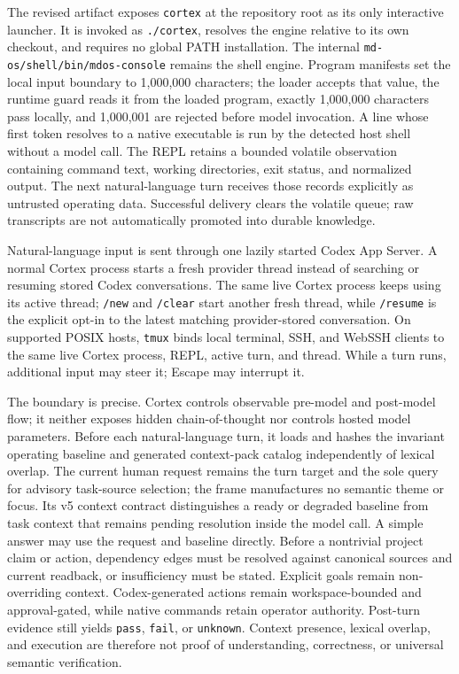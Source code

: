 \documentclass[10pt,twocolumn]{article}
\theoremstyle{definition}
\theoremstyle{plain}
\theoremstyle{remark}
\newcommand{\file}[1]{\nolinkurl{#1}}
\begin{document}
The revised artifact exposes \file{cortex} at the repository root as its only interactive launcher.  It is invoked as \file{./cortex}, resolves the engine relative to its own checkout, and requires no global PATH installation.  The internal \file{md-os/shell/bin/mdos-console} remains the shell engine.  Program manifests set the local input boundary to 1,000,000 characters; the loader accepts that value, the runtime guard reads it from the loaded program, exactly 1,000,000 characters pass locally, and 1,000,001 are rejected before model invocation.  A line whose first token resolves to a native executable is run by the detected host shell without a model call.  The REPL retains a bounded volatile observation containing command text, working directories, exit status, and normalized output.  The next natural-language turn receives those records explicitly as untrusted operating data.  Successful delivery clears the volatile queue; raw transcripts are not automatically promoted into durable knowledge.

Natural-language input is sent through one lazily started Codex App Server.  A normal Cortex process starts a fresh provider thread instead of searching or resuming stored Codex conversations.  The same live Cortex process keeps using its active thread; \file{/new} and \file{/clear} start another fresh thread, while \file{/resume} is the explicit opt-in to the latest matching provider-stored conversation.  On supported POSIX hosts, \file{tmux} binds local terminal, SSH, and WebSSH clients to the same live Cortex process, REPL, active turn, and thread.  While a turn runs, additional input may steer it; Escape may interrupt it.

The boundary is precise. Cortex controls observable pre-model and post-model flow; it neither exposes hidden chain-of-thought nor controls hosted model parameters. Before each natural-language turn, it loads and hashes the invariant operating baseline and generated context-pack catalog independently of lexical overlap. The current human request remains the turn target and the sole query for advisory task-source selection; the frame manufactures no semantic theme or focus. Its v5 context contract distinguishes a ready or degraded baseline from task context that remains pending resolution inside the model call. A simple answer may use the request and baseline directly. Before a nontrivial project claim or action, dependency edges must be resolved against canonical sources and current readback, or insufficiency must be stated. Explicit goals remain non-overriding context. Codex-generated actions remain workspace-bounded and approval-gated, while native commands retain operator authority. Post-turn evidence still yields \file{pass}, \file{fail}, or \file{unknown}. Context presence, lexical overlap, and execution are therefore not proof of understanding, correctness, or universal semantic verification.
\end{document}
